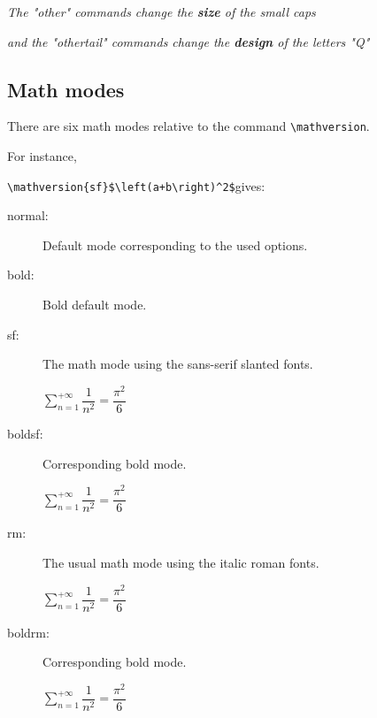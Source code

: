 \documentclass[a4paper,11pt]{article}
\begin{document}
\begin{center}
\textit{The "other" commands change the \textbf{size} of the small caps}

\textit{and the "othertail" commands change the \textbf{design} of the letters "Q"}
\end{center}

\begin{center}
\end{center}

\subsection{Math modes}

There are six math modes relative to the command \verb=\mathversion=.

For instance, 

\smallskip

\hfill\verb=\mathversion{sf}$\left(a+b\right)^2$=\quad gives:

\begin{description}
  \item[normal:] Default mode corresponding to the used options.
  \item[bold:] Bold default mode.
  \item[sf:] The math mode using the sans-serif slanted fonts.
  
             \qquad{}$\displaystyle\sum_{n=1}^{+\infty}\dfrac{1}{n^2}=\dfrac{\pi^2}{6}$
  \item[boldsf:] Corresponding bold mode.
  
             \qquad{}$\displaystyle\sum_{n=1}^{+\infty}\dfrac{1}{n^2}=\dfrac{\pi^2}{6}$
  \item[rm:] The usual math mode using the italic roman fonts.
  
             \qquad{}$\displaystyle\sum_{n=1}^{+\infty}\dfrac{1}{n^2}=\dfrac{\pi^2}{6}$
  \item[boldrm:] Corresponding bold mode.
  
             \qquad{}$\displaystyle\sum_{n=1}^{+\infty}\dfrac{1}{n^2}=\dfrac{\pi^2}{6}$
\end{description}
\end{document}
